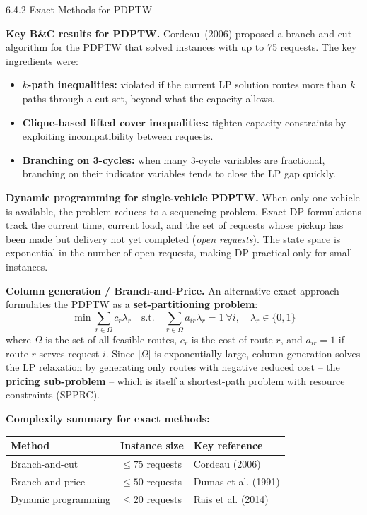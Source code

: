 \documentclass[aspectratio=169,10pt]{beamer}
\begin{document}
\begin{frame}[allowframebreaks]{6.4.2 Exact Methods for PDPTW}
  \framebreak

  \textbf{Key B\&C results for PDPTW.} Cordeau~(2006) proposed a branch-and-cut algorithm
  for the PDPTW that solved instances with up to 75 requests. The key ingredients were:
  \begin{itemize}
    \item \textbf{$k$-path inequalities:} violated if the current LP solution routes
          more than $k$ paths through a cut set, beyond what the capacity allows.
    \item \textbf{Clique-based lifted cover inequalities:} tighten capacity constraints
          by exploiting incompatibility between requests.
    \item \textbf{Branching on 3-cycles:} when many 3-cycle variables are fractional,
          branching on their indicator variables tends to close the LP gap quickly.
  \end{itemize}

  \textbf{Dynamic programming for single-vehicle PDPTW.}  When only one vehicle is
  available, the problem reduces to a sequencing problem. Exact DP formulations track the
  current time, current load, and the set of requests whose pickup has been made but
  delivery not yet completed (\emph{open requests}). The state space is exponential in the
  number of open requests, making DP practical only for small instances.

  \textbf{Column generation / Branch-and-Price.}  An alternative exact approach formulates
  the PDPTW as a \textbf{set-partitioning problem}:
  \[
    \min \sum_{r \in \Omega} c_r \lambda_r
    \quad \text{s.t.} \quad
    \sum_{r \in \Omega} a_{ir} \lambda_r = 1\ \forall i,\quad
    \lambda_r \in \{0,1\}
  \]
  where $\Omega$ is the set of all feasible routes, $c_r$ is the cost of route $r$, and
  $a_{ir} = 1$ if route $r$ serves request $i$.  Since $|\Omega|$ is exponentially large,
  column generation solves the LP relaxation by generating only routes with negative
  reduced cost -- the \textbf{pricing sub-problem} -- which is itself a shortest-path
  problem with resource constraints (SPPRC).

  \framebreak

  \textbf{Complexity summary for exact methods:}

  \begin{center}
    \begin{tabular}{lll}
      \toprule
      \textbf{Method}         & \textbf{Instance size} & \textbf{Key reference} \\
      \midrule
      Branch-and-cut          & $\leq 75$ requests      & Cordeau (2006) \\
      Branch-and-price        & $\leq 50$ requests      & Dumas et al. (1991) \\
      Dynamic programming     & $\leq 20$ requests      & Rais et al. (2014) \\
      \bottomrule
    \end{tabular}
  \end{center}


\end{frame}
\end{document}
